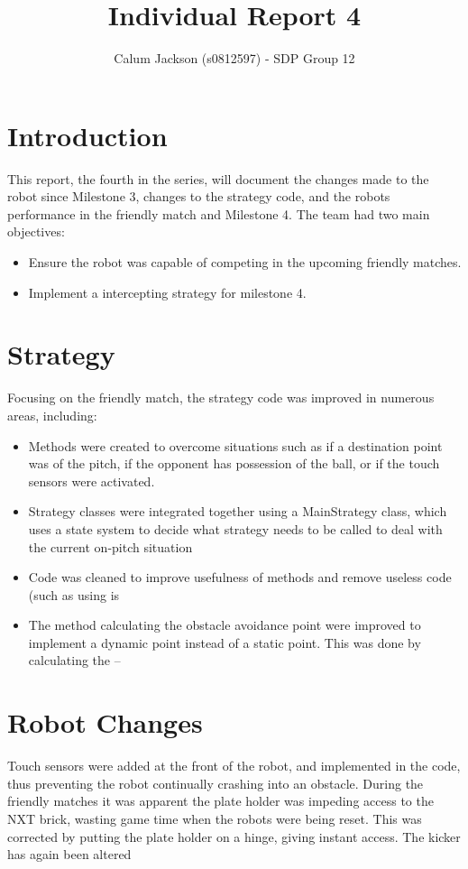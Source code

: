 \documentclass[12pt]{article}
\begin{document}
\title{Individual Report 4}
\author{Calum Jackson (s0812597) - 
SDP Group 12}
\maketitle
\begin{flushleft}

\section{Introduction}
This report, the fourth in the series, will document the changes made to the robot since Milestone 3, changes to the strategy code, and the robots performance in the friendly match and Milestone 4. The team had two main objectives:
\begin{itemize}
\item Ensure the robot was capable of competing in the upcoming friendly matches.
\item Implement a intercepting strategy for milestone 4.
\end{itemize}

\section{Strategy}
Focusing on the friendly match, the strategy code was improved in numerous areas, including:
\begin{itemize}
\item Methods were created to overcome situations such as if a destination point was of the pitch, if the opponent has possession of the ball, or if the touch sensors were activated.
\item Strategy classes were integrated together using a MainStrategy class, which uses a state system to decide what strategy needs to be called to deal with the current on-pitch situation
\item Code was cleaned to improve usefulness of methods and remove useless code (such as using is
\item The method calculating the obstacle avoidance point were improved to implement a dynamic point instead of a static point. This was done by calculating the --
\end{itemize}

\section{Robot Changes}
Touch sensors were added at the front of the robot, and implemented in the code, thus preventing the robot continually crashing into an obstacle. During the friendly matches it was apparent the plate holder was impeding access to the NXT brick, wasting game time when the robots were being reset. This was corrected by putting the plate holder on a hinge, giving instant access. The kicker has again been altered 






\end{flushleft}
\end{document}

